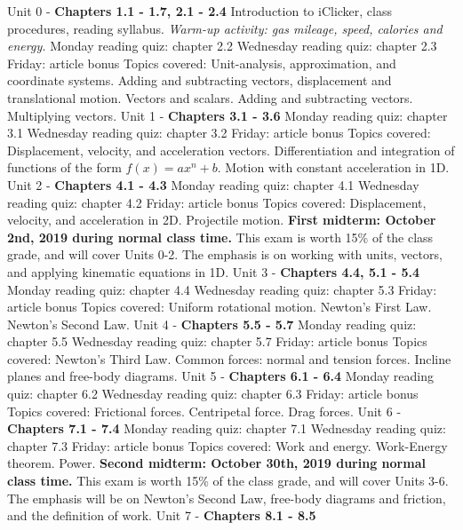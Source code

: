 \documentclass[10pt]{article}
\begin{document}
\begin{outline}[enumerate]
\1 Unit 0 - \textbf{Chapters 1.1 - 1.7, 2.1 - 2.4}
\2 Introduction to iClicker, class procedures, reading syllabus.
\2 \textit{Warm-up activity: gas mileage, speed, calories and energy.}
\2 Monday reading quiz: chapter 2.2
\2 Wednesday reading quiz: chapter 2.3
\2 Friday: article bonus
\2 Topics covered: 
\3 Unit-analysis, approximation, and coordinate systems.
\3 Adding and subtracting vectors, displacement and translational motion.
\3 Vectors and scalars.
\3 Adding and subtracting vectors.
\3 Multiplying vectors.
\1 Unit 1 - \textbf{Chapters 3.1 - 3.6}
\2 Monday reading quiz: chapter 3.1
\2 Wednesday reading quiz: chapter 3.2
\2 Friday: article bonus
\2 Topics covered:
\3 Displacement, velocity, and acceleration vectors.
\3 Differentiation and integration of functions of the form $f(x) = a x^n + b$.
\3 Motion with constant acceleration in 1D.
\1 Unit 2 - \textbf{Chapters 4.1 - 4.3}
\2 Monday reading quiz: chapter 4.1
\2 Wednesday reading quiz: chapter 4.2
\2 Friday: article bonus
\2 Topics covered:
\3 Displacement, velocity, and acceleration in 2D.
\3 Projectile motion.
\1 \textbf{First midterm: October 2nd, 2019 during normal class time.}  This exam is worth 15\% of the class grade, and will cover Units 0-2. The emphasis is on working with units, vectors, and applying kinematic equations in 1D.
\1 Unit 3 - \textbf{Chapters 4.4, 5.1 - 5.4}
\2 Monday reading quiz: chapter 4.4
\2 Wednesday reading quiz: chapter 5.3
\2 Friday: article bonus
\2 Topics covered:
\3 Uniform rotational motion.
\3 Newton's First Law.
\3 Newton's Second Law.
\1 Unit 4 - \textbf{Chapters 5.5 - 5.7}
\2 Monday reading quiz: chapter 5.5
\2 Wednesday reading quiz: chapter 5.7
\2 Friday: article bonus
\2 Topics covered:
\3 Newton's Third Law.
\3 Common forces: normal and tension forces.
\3 Incline planes and free-body diagrams.
\1 Unit 5 - \textbf{Chapters 6.1 - 6.4}
\2 Monday reading quiz: chapter 6.2
\2 Wednesday reading quiz: chapter 6.3
\2 Friday: article bonus
\2 Topics covered:
\3 Frictional forces.
\3 Centripetal force.
\3 Drag forces.
\1 Unit 6 - \textbf{Chapters 7.1 - 7.4}
\2 Monday reading quiz: chapter 7.1
\2 Wednesday reading quiz: chapter 7.3
\2 Friday: article bonus
\2 Topics covered:
\3 Work and energy.
\3 Work-Energy theorem.
\3 Power.
\1 \textbf{Second midterm: October 30th, 2019 during normal class time.} This exam is worth 15\% of the class grade, and will cover Units 3-6. The emphasis will be on Newton's Second Law, free-body diagrams and friction, and the definition of work.
\1 Unit 7 - \textbf{Chapters 8.1 - 8.5}

\end{outline}
\end{document}

